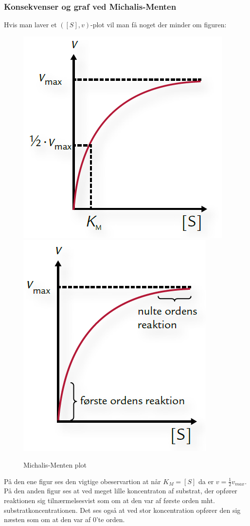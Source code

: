 \subsubsection{Konsekvenser og graf ved Michalis-Menten}
Hvis man laver et $([S],v)$-plot vil man få noget der minder om figuren:
\begin{figure}[h]
    \centering
    \includegraphics[scale=0.6]{Figurer/MMplot1} \hspace{2cm}
    \includegraphics[scale=0.6]{Figurer/MMplot2}
    \caption{Michalis-Menten plot}
\end{figure}
På den ene figur ses den vigtige obeservartion at når $K_M=[S]$ da er $v=\frac{1}{2}v_{max}$.
På den anden figur ses at ved meget lille koncentraton af substrat, der opfører reaktionen sig tilnærmelsesvist som om at den var af første orden mht. substratkoncentrationen. 
Det ses også at ved stor koncentration opfører den sig næsten som om at den var af 0'te orden.